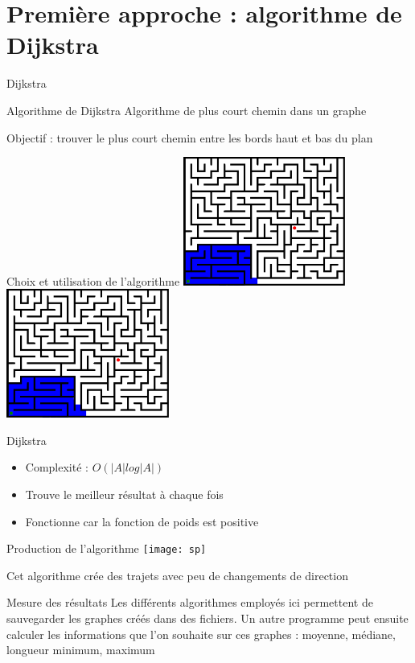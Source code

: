 \documentclass[aspectratio=43,11pt]{beamer}
\begin{document}
\section{Première approche : algorithme de Dijkstra}
\begin{frame}{Dijkstra}
    \begin{block}{Algorithme de Dijkstra}
        Algorithme de plus court chemin dans un graphe
    \end{block}
    Objectif : trouver le plus court chemin entre les bords haut et bas du plan
\end{frame}
\begin{frame}{Choix et utilisation de l'algorithme}
    \centering
    \includegraphics[width=0.4\textwidth]{maze1}
    \centering
    \includegraphics[width=0.4\textwidth]{maze2}
\end{frame}
\begin{frame}{Dijkstra}
    \begin{itemize}
        \item Complexité : $O(|A| log |A|)$
        \item Trouve le meilleur résultat à chaque fois
        \item Fonctionne car la fonction de poids est positive
    \end{itemize}
\end{frame}
\begin{frame}{Production de l'algorithme}
    \centering
        \texttt{[image: sp]}

    Cet algorithme crée des trajets avec peu de changements de direction
\end{frame}
\begin{frame}{Mesure des résultats}
    Les différents algorithmes employés ici permettent de sauvegarder les graphes créés dans des fichiers.
    Un autre programme peut ensuite calculer les informations que l'on souhaite sur ces graphes : moyenne, médiane, longueur minimum, maximum
\end{frame}
\end{document}
